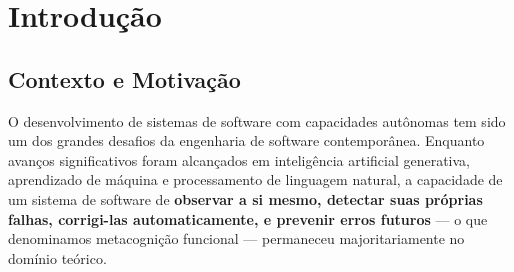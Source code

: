 \chapter{Introdução}
\label{ch:introducao}

\section{Contexto e Motivação}

O desenvolvimento de sistemas de software com capacidades autônomas tem sido um dos grandes desafios da engenharia de software contemporânea. Enquanto avanços significativos foram alcançados em inteligência artificial generativa, aprendizado de máquina e processamento de linguagem natural, a capacidade de um sistema de software de \textbf{observar a si mesmo, detectar suas próprias falhas, corrigi-las automaticamente, e prevenir erros futuros} — o que denominamos metacognição funcional — permaneceu majoritariamente no domínio teórico.

